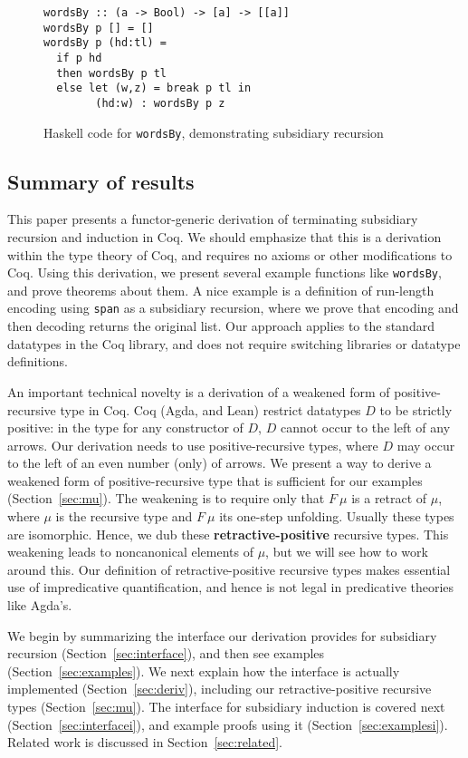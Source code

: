 \documentclass[a4paper,USenglish]{lipics-v2021}
\begin{document}
\begin{figure}
\begin{verbatim}
wordsBy :: (a -> Bool) -> [a] -> [[a]]
wordsBy p [] = []
wordsBy p (hd:tl) =
  if p hd
  then wordsBy p tl 
  else let (w,z) = break p tl in
        (hd:w) : wordsBy p z
\end{verbatim}
\caption{Haskell code for \texttt{wordsBy}, demonstrating subsidiary recursion}
\label{fig:wordsBy}
\end{figure}

\subsection{Summary of results}

This paper presents a functor-generic derivation of terminating
subsidiary recursion and induction in Coq.  We should emphasize that
this is a derivation within the type theory of Coq, and requires no
axioms or other modifications to Coq. Using this derivation, we
present several example functions like \verb|wordsBy|, and prove
theorems about them.  A nice example is a definition of run-length
encoding using \verb|span| as a subsidiary recursion, where we prove
that encoding and then decoding returns the original list.  Our
approach applies to the standard datatypes in the Coq library, and
does not require switching libraries or datatype definitions.

An important technical novelty is a derivation of a weakened form of
positive-recursive type in Coq.  Coq (Agda, and Lean) restrict
datatypes $D$ to be strictly positive: in the type for any constructor
of $D$, $D$ cannot occur to the left of any arrows.  Our derivation
needs to use positive-recursive types, where $D$ may occur to the left
of an even number (only) of arrows.  We present a way to derive a
weakened form of positive-recursive type that is sufficient for our
examples (Section~\ref{sec:mu}).  The weakening is to require only
that $F\ \mu$ is a retract of $\mu$, where $\mu$ is the recursive type
and $F\ \mu$ its one-step unfolding.  Usually these types are
isomorphic.  Hence, we dub these \textbf{retractive-positive}
recursive types.  This weakening leads to noncanonical elements of
$\mu$, but we will see how to work around this.  Our definition of
retractive-positive recursive types makes essential use of impredicative
quantification, and hence is not legal in predicative theories
like Agda's.

We begin by summarizing the interface our derivation provides for
subsidiary recursion (Section~\ref{sec:interface}), and then see
examples (Section~\ref{sec:examples}).  We next explain how the
interface is actually implemented (Section~\ref{sec:deriv}), including
our retractive-positive recursive types (Section~\ref{sec:mu}).  The
interface for subsidiary induction is covered next
(Section~\ref{sec:interfacei}), and example proofs using it
(Section~\ref{sec:examplesi}).  Related work is discussed in
Section~\ref{sec:related}.
\end{document}
